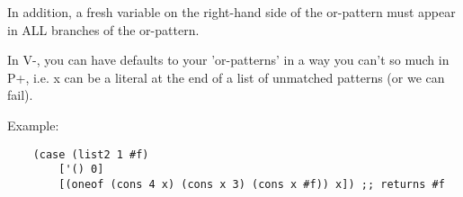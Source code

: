 \documentclass[]{article}
\begin{document}
In addition, a fresh variable on the right-hand side of the or-pattern must
appear in ALL branches of the or-pattern. 

In V-, you can have defaults to your 'or-patterns' in a way you can't so much in
P+, i.e. x can be a literal at the end of a list of unmatched patterns (or we
can fail).

Example: 
\begin{verbatim}
    (case (list2 1 #f)
        ['() 0]
        [(oneof (cons 4 x) (cons x 3) (cons x #f)) x]) ;; returns #f
\end{verbatim}







\end{document}
